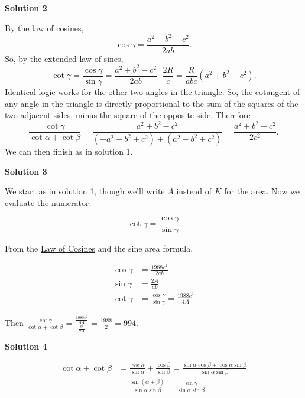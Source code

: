\begin{enumerate}
\textbf{Solution 2}

By the \href{https://artofproblemsolving.com/wiki/index.php?title=Law\_of\_cosines}{law of cosines},
 \[\cos \gamma = \frac{a^2 + b^2 - c^2}{2ab}.\] So, by the extended \href{https://artofproblemsolving.com/wiki/index.php?title=Law\_of\_sines}{law of sines},
 \[\cot \gamma = \frac{\cos \gamma}{\sin \gamma} = \frac{a^2 + b^2 - c^2}{2ab} \cdot \frac{2R}{c} = \frac{R}{abc} (a^2 + b^2 - c^2).\]Identical logic works for the other two angles in the triangle.  So, the cotangent of any angle in the triangle is directly proportional to the sum of the squares of the two adjacent sides, minus the square of the opposite side.  Therefore
 \[\frac{\cot \gamma}{\cot \alpha + \cot \beta} = \frac{a^2 + b^2 - c^2}{(-a^2 + b^2 + c^2) + (a^2 - b^2 + c^2)} = \frac{a^2 + b^2 - c^2}{2c^2}.\]We can then finish as in solution 1.

 



\textbf{Solution 3}

We start as in solution 1, though we'll write $A$ instead of $K$ for the area.  Now we evaluate the numerator:

 
 \[\cot{\gamma}=\frac{\cos{\gamma}}{\sin{\gamma}}\]

 From the \href{https://artofproblemsolving.com/wiki/index.php?title=Law\_of\_Cosines}{Law of Cosines} and the sine area formula, 

 
 \begin{align*}\cos{\gamma}&=\frac{1988c^2}{2ab}\\ \sin{\gamma}&= \frac{2A}{ab}\\ \cot{\gamma}&= \frac{\cos \gamma}{\sin \gamma} = \frac{1988c^2}{4A} \end{align*}


 Then $\frac{\cot \gamma}{\cot \alpha+\cot \beta}=\frac{\frac{1988c^2}{4A}}{\frac{c^2}{2A}}=\frac{1988}{2}=\boxed{994}$.

 



\textbf{Solution 4}


 \begin{align*} \cot{\alpha} + \cot{\beta} &= \frac {\cos{\alpha}}{\sin{\alpha}} + \frac {\cos{\beta}}{\sin{\beta}} = \frac {\sin{\alpha}\cos{\beta} + \cos{\alpha}\sin{\beta}}{\sin{\alpha}\sin{\beta}}\\ &= \frac {\sin{(\alpha + \beta)}}{\sin{\alpha}\sin{\beta}} = \frac {\sin{\gamma}}{\sin{\alpha}\sin{\beta}} \end{align*}



\end{enumerate}
